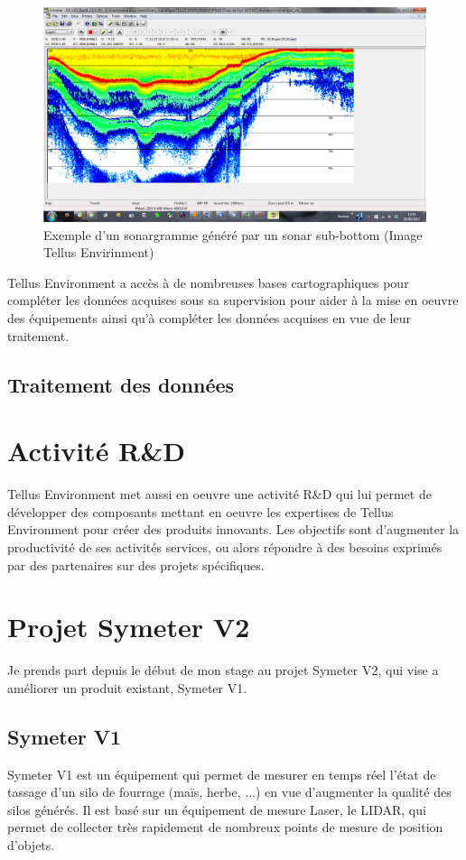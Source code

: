 \documentclass[12pt,a4paper]{report}
\begin{document}
	\begin{figure}
		\centering
		\includegraphics[width=0.7\linewidth]{img/E1790}
		\caption[sonargramme]{Exemple d'un sonargramme généré par un sonar sub-bottom (Image Tellus Envirinment)}
		\label{fig:e1790}
	\end{figure}
	
	\para Tellus Environment a accès à de nombreuses bases cartographiques pour compléter les données acquises sous sa supervision pour aider à la mise en oeuvre des équipements ainsi qu'à compléter les données acquises en vue de leur traitement.

	\subsection{Traitement des données}

	\section{Activité R\&D}
	
	Tellus Environment met aussi en oeuvre une activité R\&D qui lui permet de développer des composants mettant en oeuvre les expertises de Tellus Environment pour créer des produits innovants. Les objectifs sont d'augmenter la productivité de ses activités services, ou alors répondre à des besoins  exprimés par des partenaires sur des projets spécifiques.


	\section{Projet Symeter V2}
	Je prends part depuis le début de mon stage au projet Symeter V2, qui vise a améliorer un produit existant, Symeter V1.
		\subsection{Symeter V1}
		Symeter V1 est un équipement qui permet de mesurer en temps réel l'état de tassage d'un silo de fourrage (maïs, herbe, ...) en vue d'augmenter la qualité des silos générés. Il est basé sur un équipement de mesure Laser, le LIDAR, qui permet de collecter très rapidement de nombreux points de mesure de position d'objets. 
		
\end{document}
